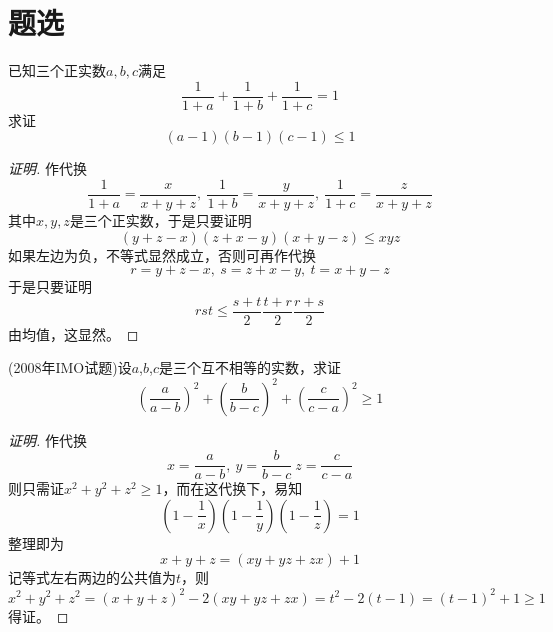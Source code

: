 
\section{题选}
\label{sec:inequality-exercises}

\begin{exercise}
  已知三个正实数$a,b,c$满足
  \begin{equation*}
    \frac{1}{1+a} + \frac{1}{1+b} + \frac{1}{1+c} = 1
  \end{equation*}
  求证
  \begin{equation*}
    (a-1)(b-1)(c-1) \leqslant 1
  \end{equation*}
\end{exercise}

\begin{proof}[证明]
  作代换
  \begin{equation*}
    \frac{1}{1+a} = \frac{x}{x+y+z}, \  \frac{1}{1+b} = \frac{y}{x+y+z}, \  \frac{1}{1+c} = \frac{z}{x+y+z}
  \end{equation*}
  其中$x,y,z$是三个正实数，于是只要证明
  \begin{equation*}
    (y+z-x)(z+x-y)(x+y-z) \leqslant xyz
  \end{equation*}
  如果左边为负，不等式显然成立，否则可再作代换
  \begin{equation*}
    r = y+z-x, \  s = z+x-y, \  t = x+y-z
  \end{equation*}
  于是只要证明
  \begin{equation*}
    rst \leqslant \frac{s+t}{2} \frac{t+r}{2} \frac{r+s}{2}
  \end{equation*}
  由均值，这显然。
\end{proof}

\begin{exercise}
  (2008年IMO试题)设$a$,$b$,$c$是三个互不相等的实数，求证
  \[ \left( \frac{a}{a-b} \right)^2 + \left( \frac{b}{b-c} \right)^2 + \left( \frac{c}{c-a} \right)^2 \geqslant 1 \]
\end{exercise}

\begin{proof}[证明]
  作代换
  \[ x=\frac{a}{a-b}, \  y=\frac{b}{b-c} \  z=\frac{c}{c-a} \]
  则只需证$x^2+y^2+z^2 \geqslant 1$，而在这代换下，易知
  \[ \left( 1-\frac{1}{x} \right) \left( 1-\frac{1}{y} \right) \left( 1-\frac{1}{z} \right) = 1 \]
  整理即为
  \[ x+y+z = (xy+yz+zx)+1 \]
  记等式左右两边的公共值为$t$，则
    \[ x^2+y^2+z^2 = (x+y+z)^2-2(xy+yz+zx) = t^2-2(t-1)=(t-1)^2+1 \geqslant 1 \]
  得证。
\end{proof}

